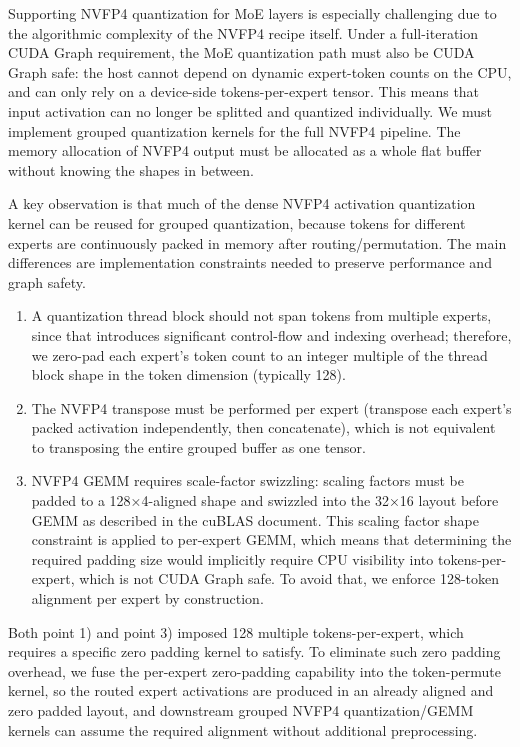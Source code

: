 Supporting NVFP4 quantization for MoE layers is especially challenging due to the algorithmic complexity of the NVFP4 recipe itself. Under a full-iteration CUDA Graph requirement, the MoE quantization path must also be CUDA Graph safe: the host cannot depend on dynamic expert-token counts on the CPU, and can only rely on a device-side tokens-per-expert tensor. This means that input activation can no longer be splitted and quantized individually. We must implement grouped quantization kernels for the full NVFP4 pipeline. The memory allocation of NVFP4 output must be allocated as a whole flat buffer without knowing the shapes in between. 

A key observation is that much of the dense NVFP4 activation quantization kernel can be reused for grouped quantization, because tokens for different experts are continuously packed in memory after routing/permutation. The main differences are implementation constraints needed to preserve performance and graph safety. 

\begin{enumerate}

\item A quantization thread block should not span tokens from multiple experts, since that introduces significant control-flow and indexing overhead; therefore, we zero-pad each expert’s token count to an integer multiple of the thread block shape in the token dimension (typically 128). 

\item The NVFP4 transpose must be performed per expert (transpose each expert’s packed activation independently, then concatenate), which is not equivalent to transposing the entire grouped buffer as one tensor. 

\item NVFP4 GEMM requires scale-factor swizzling: scaling factors must be padded to a 128×4-aligned shape and swizzled into the 32×16 layout before GEMM as described in the cuBLAS document\cite{cublas_sf_layout}. This scaling factor shape constraint is applied to per-expert GEMM, which means that determining the required padding size would implicitly require CPU visibility into tokens-per-expert, which is not CUDA Graph safe. To avoid that, we enforce 128-token alignment per expert by construction.
\end{enumerate}

Both point 1) and point 3) imposed 128 multiple tokens-per-expert, which requires a specific zero padding kernel to satisfy. To eliminate such zero padding overhead, we fuse the per-expert zero-padding capability into the token-permute kernel, so the routed expert activations are produced in an already aligned and zero padded layout, and downstream grouped NVFP4 quantization/GEMM kernels can assume the required alignment without additional preprocessing.

